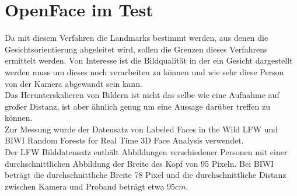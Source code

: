 \section{OpenFace im Test}
Da mit diesem Verfahren die Landmarks bestimmt werden, aus denen die Gesichtsorientierung abgeleitet wird, sollen die Grenzen dieses Verfahrens ermittelt werden. Von Interesse ist die Bildqualität in der ein Gesicht dargestellt werden muss um dieses noch verarbeiten zu können und wie sehr diese Person von der Kamera abgewandt sein kann.\\
Das Herunterskalieren von Bildern ist nicht das selbe wie eine Aufnahme auf großer Distanz, ist aber ähnlich genug um eine Aussage darüber treffen zu können.\\
Zur Messung wurde der Datensatz von Labeled Faces in the Wild LFW \cite{database_Face} und BIWI Random Forests for Real Time 3D Face Analysis \cite{database_Face_Ori} verwendet.\\
Der LFW Bilddatensatz enthält Abbildungen verschiedener Personen mit einer durchschnittlichen Abbildung der Breite des Kopf von 95 Pixeln. Bei BIWI beträgt die durchschnittliche Breite 78 Pixel und die durchschnittliche Distanz zwischen Kamera und Proband beträgt etwa $95cm$.
